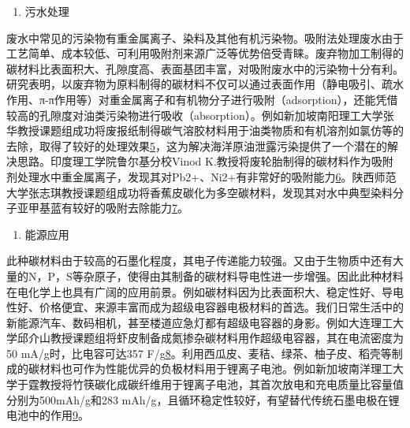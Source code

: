 \documentclass[]{book}
\providecommand{\tightlist}{%
  \setlength{\itemsep}{0pt}\setlength{\parskip}{0pt}}
\begin{document}
\begin{enumerate}
\def\labelenumi{\arabic{enumi}.}
\setcounter{enumi}{1}
\tightlist
\item
  污水处理
\end{enumerate}

废水中常见的污染物有重金属离子、染料及其他有机污染物。吸附法处理废水由于工艺简单、成本较低、可利用吸附剂来源广泛等优势倍受青睐。废弃物加工制得的碳材料比表面积大、孔隙度高、表面基团丰富，对吸附废水中的污染物十分有利。研究表明，以废弃物为原料制得的碳材料不仅可以通过表面作用（静电吸引、疏水作用、π-π作用等）对重金属离子和有机物分子进行吸附（adsorption），还能凭借较高的孔隙度对油类污染物进行吸收（absorption）。例如新加坡南阳理工大学张华教授课题组成功将废报纸制得碳气溶胶材料用于油类物质和有机溶剂如氯仿等的去除，取得了较好的处理效果\href{Bi\%20H,\%20Huang\%20X,\%20et\%20al.\%20Small\%202014,\%2010,\%203544.}{5}，这为解决海洋原油泄露污染提供了一个潜在的解决思路。印度理工学院鲁尔基分校Vinod
K.教授将废轮胎制得的碳材料作为吸附剂处理水中重金属离子，发现其对Pb2+、Ni2+有非常好的吸附能力\href{Gupta\%20V\%20K,\%20Ganjali\%20M\%20R,\%20et\%20al.\%20Chemical\%20Engineering\%20Journal,\%202012,\%20197:\%20330.}{6}。陕西师范大学张志琪教授课题组成功将香蕉皮碳化为多空碳材料，发现其对水中典型染料分子亚甲基蓝有较好的吸附去除能力\href{Liu\%20R\%20L,\%20Liu\%20Y,\%20et\%20al.\%20Bioresourse\%20Technology\%202014,\%20154:\%20138.}{7}。

\begin{enumerate}
\def\labelenumi{\arabic{enumi}.}
\setcounter{enumi}{2}
\tightlist
\item
  能源应用
\end{enumerate}

此种碳材料由于较高的石墨化程度，其电子传递能力较强。又由于生物质中还有大量的N，P，S等杂原子，使得由其制备的碳材料导电性进一步增强。因此此种材料在电化学上也具有广阔的应用前景。例如碳材料因为比表面积大、稳定性好、导电性好、价格便宜、来源丰富而成为超级电容器电极材料的首选。我们日常生活中的新能源汽车、数码相机，甚至楼道应急灯都有超级电容器的身影。例如大连理工大学邱介山教授课题组将虾皮制备成氮掺杂碳材料用作超级电容器，其在电流密度为50
mA/g时，比电容可达357
F/g\href{Gao\%20F,Qu\%20J\%20Y,\%20et\%20al.\%20Electrochim.\%20Acta\%202016,\%20190:\%201134.}{8}。利用西瓜皮、麦秸、绿茶、柚子皮、稻壳等制成的碳材料也可作为性能优异的负极材料用于锂离子电池。例如新加坡南洋理工大学于霆教授将竹筷碳化成碳纤维用于锂离子电池，其首次放电和充电质量比容量值分别为500mAh/g和283
mAh/g，且循环稳定性较好，有望替代传统石墨电极在锂电池中的作用\href{Jiang\%20J,\%20Zhu\%20J\%20H,\%20et\%20al.\%20Energy\%20Environ.\%20Sci.\%202014,\%207:\%202670.}{9}。
\end{document}
